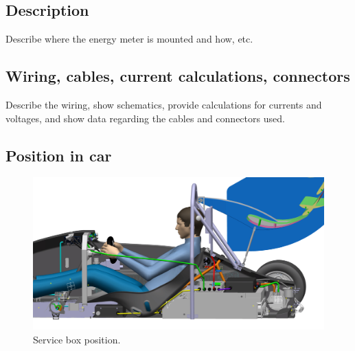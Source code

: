 \subsection{Description}
Describe where the energy meter is mounted and how, etc.

\subsection{Wiring, cables, current calculations, connectors}
Describe the wiring, show schematics, provide calculations for currents and voltages, and show data regarding the cables and connectors used.

\subsection{Position in car}

\begin{figure}[H]
	\centering
	\includegraphics[width=.5\textwidth]{./img/ServiceBox-position.jpg}
	\caption{Service box position.}
	\label{fig:ServiceBox-position}
\end{figure}





